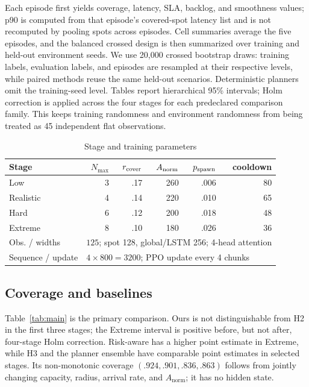 \documentclass[conference]{IEEEtran}
\begin{document}
Each episode first yields coverage, latency, SLA, backlog, and smoothness
values; p90 is computed from that episode's covered-spot latency list and is
not recomputed by pooling spots across episodes. Cell summaries average the
five episodes, and the balanced crossed design is then summarized over
training and held-out environment seeds. We use 20,000 crossed bootstrap
draws: training labels, evaluation labels, and episodes are resampled at their
respective levels, while paired methods reuse the same held-out scenarios.
Deterministic planners omit the training-seed level. Tables report
hierarchical 95\% intervals; Holm correction is applied across the four
stages for each predeclared comparison family. This keeps training randomness
and environment randomness from being treated as 45 independent flat
observations.

\begin{table}[t]
\caption{Stage and training parameters}
\label{tab:stage}
\centering\scriptsize\setlength{\tabcolsep}{2.5pt}
\begin{tabular}{@{}lrrrrr@{}}
\toprule
Stage & $N_{\max}$ & $r_{\rm cover}$ & $A_{\rm norm}$ & $p_{\rm spawn}$ & cooldown\\
\midrule
Low & 3 & .17 & 260 & .006 & 80\\
Realistic & 4 & .14 & 220 & .010 & 65\\
Hard & 6 & .12 & 200 & .018 & 48\\
Extreme & 8 & .10 & 180 & .026 & 36\\
\midrule
Obs. / widths & \multicolumn{5}{l}{$125$; spot 128, global/LSTM 256; 4-head attention}\\
Sequence / update & \multicolumn{5}{l}{$4\times800=3200$; PPO update every 4 chunks}\\
\bottomrule
\end{tabular}
\end{table}

\subsection{Coverage and baselines}
Table~\ref{tab:main} is the primary comparison. Ours is not distinguishable
from H2 in the first three stages; the Extreme interval is positive before,
but not after, four-stage Holm correction. Risk-aware has a higher point
estimate in Extreme, while H3 and the planner ensemble have comparable point
estimates in selected stages. Its
non-monotonic coverage $(.924,.901,.836,.863)$ follows from jointly changing
capacity, radius, arrival rate, and $A_{\mathrm{norm}}$; it has no hidden state.
\end{document}
